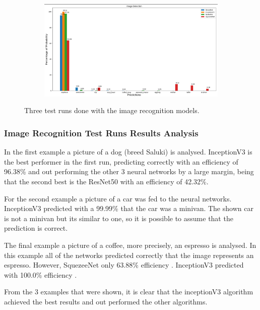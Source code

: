 \begin{figure}[H]
\begin{subfigure}{0.25\textwidth}
      \end{subfigure}
      \begin{subfigure}{0.74\textwidth}
      \includegraphics[width=\textwidth]{Sections/4InitialWork/4_images/run4_res.png}
      \end{subfigure}
      
      \caption{Three test runs done with the image recognition models.}
      \end{figure}


\newpage

\subsubsection{Image Recognition Test Runs Results Analysis}
\label{sec:results_image}


In the first example a picture of a dog (breed Saluki) is analysed. InceptionV3 is the best performer in the first run, predicting correctly with an efficiency of 96.38\% and out performing the other 3 neural networks by a large margin, being that the second best is the ResNet50 with an efficiency of 42.32\%.

For the second example a picture of a car was fed to the neural networks. InceptionV3 predicted with a 99.99\% that the car was a minivan. The shown car is not a minivan but its similar to one, so it is possible to assume that the prediction is correct.

The final example a picture of a coffee, more precisely, an espresso is analysed. In this example all of the networks predicted correctly that the image represents an espresso. However, SquezeeNet only 63.88\% efficiency . InceptionV3 predicted with 100.0\% efficiency .

From the 3 examples that were shown, it is clear that the inceptionV3 algorithm achieved the best results and out performed the other algorithms.






